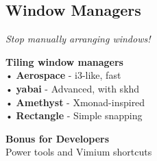 \documentclass[11pt,landscape,a4paper]{article}
\newif\ifmac
\newif\ifincludeBonus
\begin{document}
\begin{multicols}{3}
\columnbreak

\section*{Window Managers}

\textit{\footnotesize Stop manually arranging windows!}

\begin{macbox}
\textbf{Tiling window managers}\\
• \textbf{Aerospace} - i3-like, fast\\
• \textbf{yabai} - Advanced, with skhd\\
• \textbf{Amethyst} - Xmonad-inspired\\
• \textbf{Rectangle} - Simple snapping
\end{macbox}

\end{multicols}

\fi
\ifmac\newpage\fi

\ifincludeBonus
\begin{center}
    {\LARGE\bfseries\color{devcolor} Bonus for Developers}\\[0.2em]
    {\normalsize\color{gray} Power tools and Vimium shortcuts}
\end{center}

\vspace{-0.2em}
\end{document}
